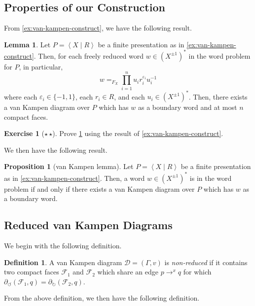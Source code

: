 \documentclass[11pt,a4paper,reqno]{amsart}
\theoremstyle{plain}
\theoremstyle{definition}
\newtheorem{lemma}[theorem]{Lemma}
\newtheorem{proposition}[theorem]{Proposition}
\newtheorem{definition}[theorem]{Definition}
\theoremstyle{definition}
\newtheorem{exercise}[theorem]{Exercise}
\newcommand\exerciseLevelMedium{$\star${\,}$\star$}
\begin{document}
\subsection{Properties of our Construction}

From \cref{ex:van-kampen-construct}, we have the following result.

\begin{lemma}\label{lem:van-kampen-construct}
	Let $P = \left\langle X\mid R \right\rangle$ be a finite presentation as in \cref{ex:van-kampen-construct}.
	Then, for each freely reduced word $w\in (X^{\pm 1})^*$ in the word problem for $P$, in particular,
	\[
		w
		=_{F_X}
		\prod_{i=1}^{n}
		u_i r_i^{\varepsilon_i} u_{i}^{-1}
	\]
	where
	each $\varepsilon_i\in \{-1,1\}$, each $r_i \in R$, and each $u_i\in (X^{\pm 1})^*$.
	Then, there exists a van Kampen diagram over $P$ which has $w$ as a boundary word and at most $n$ compact faces.
\end{lemma}
\begin{exercise}[\exerciseLevelMedium]
	Prove \cref{lem:van-kampen-construct} using the result of \cref{ex:van-kampen-construct}.
\end{exercise}

We then have the following result.

\begin{proposition}[van Kampen lemma]\label{prop:van-kampen-lemma}
	Let $P = \left\langle X\mid R \right\rangle$ be a finite presentation as in \cref{ex:van-kampen-construct}.
	Then, a word $w\in (X^{\pm 1})^*$ is in the word problem if and only if there exists a van Kampen diagram over $P$ which has $w$ as a boundary word.
\end{proposition}

\subsection{Reduced van Kampen Diagrams}

We begin with the following definition.

\begin{definition}\label{def:non-reduced}
	A van Kampen diagram $\mathcal D = (\Gamma, v)$ is \emph{non-reduced} if it contains two compact faces $\mathcal F_1$ and $\mathcal F_2$ which share an edge $p\to^x q$ for which $\partial_\circlearrowleft (\mathcal F_1,q) = \partial_\circlearrowright (\mathcal F_2,q)$.
\end{definition}

From the above definition, we then have the following definition.
\end{document}
